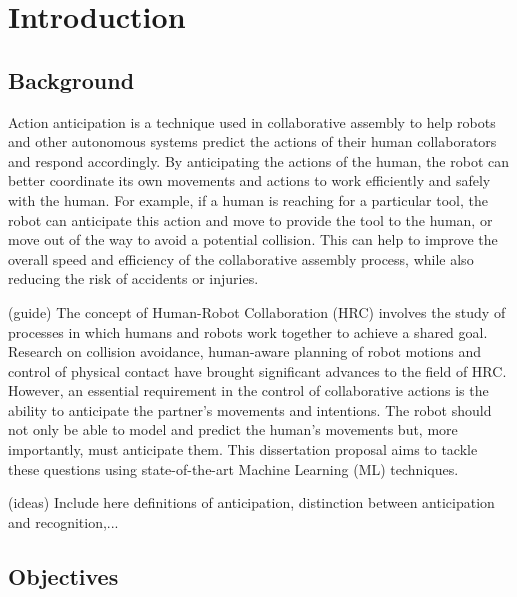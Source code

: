 \chapter{Introduction}
\label{chapter:introduction}

\section{Background}

{\color{gray}
Action anticipation is a technique used in collaborative assembly to help robots and other autonomous systems predict the actions of their human collaborators and respond accordingly. By anticipating the actions of the human, the robot can better coordinate its own movements and actions to work efficiently and safely with the human. For example, if a human is reaching for a particular tool, the robot can anticipate this action and move to provide the tool to the human, or move out of the way to avoid a potential collision. This can help to improve the overall speed and efficiency of the collaborative assembly process, while also reducing the risk of accidents or injuries.
}

{\color{red}
(guide) The concept of Human-Robot Collaboration (HRC) involves the study of processes in which humans and robots work together to achieve a shared goal. Research on collision avoidance, human-aware planning of robot motions and control of physical contact have brought significant advances to the field of HRC. However, an essential requirement in the control of collaborative actions is the ability to anticipate the partner’s movements and intentions. The robot should not only be able to model and predict the human’s movements but, more importantly, must anticipate them. This dissertation proposal aims to tackle these questions using state-of-the-art Machine Learning (ML) techniques.
}

{\color{gray}
(ideas) Include here definitions of anticipation, distinction between anticipation and recognition,...
}

\section{Objectives}

